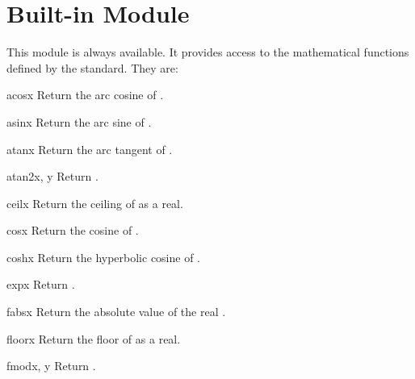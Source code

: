 \section{Built-in Module }
\label{module-math}

This module is always available.
It provides access to the mathematical functions defined by the \C{}
standard.
They are:

\begin{funcdesc}{acos}{x}
Return the arc cosine of .
\end{funcdesc}

\begin{funcdesc}{asin}{x}
Return the arc sine of .
\end{funcdesc}

\begin{funcdesc}{atan}{x}
Return the arc tangent of .
\end{funcdesc}

\begin{funcdesc}{atan2}{x, y}
Return .
\end{funcdesc}

\begin{funcdesc}{ceil}{x}
Return the ceiling of  as a real.
\end{funcdesc}

\begin{funcdesc}{cos}{x}
Return the cosine of .
\end{funcdesc}

\begin{funcdesc}{cosh}{x}
Return the hyperbolic cosine of .
\end{funcdesc}

\begin{funcdesc}{exp}{x}
Return .
\end{funcdesc}

\begin{funcdesc}{fabs}{x}
Return the absolute value of the real .
\end{funcdesc}

\begin{funcdesc}{floor}{x}
Return the floor of  as a real.
\end{funcdesc}

\begin{funcdesc}{fmod}{x, y}
Return .
\end{funcdesc}

